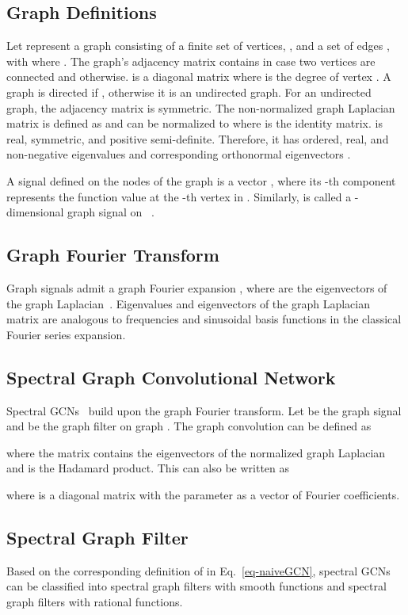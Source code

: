 \documentclass[runningheads]{llncs}
\begin{document}
\subsection{Graph Definitions}
Let  represent a graph consisting of a finite set of  vertices, , and a set of  edges , with  where .
The graph's adjacency matrix  contains  in case two vertices are connected and  otherwise. 
 is a diagonal matrix where  is the degree of vertex .
A graph is directed if , otherwise it is an undirected graph. For an undirected graph, the adjacency matrix is symmetric.
The non-normalized graph Laplacian matrix is defined as 
and can be normalized to 
where  is the identity matrix. 
 is  real, symmetric, and positive semi-definite. Therefore, it has  ordered, real, and non-negative eigenvalues  and corresponding orthonormal eigenvectors . 

A signal  defined on the nodes of the graph is a vector , where its -th component represents the function value at the -th vertex in . Similarly,  is called a -dimensional graph signal on ~\cite{shuman2013emerging}. 
\subsection{Graph Fourier Transform}
Graph signals  admit a graph Fourier expansion , where  are the eigenvectors of the  graph Laplacian~\cite{shuman2013emerging}. Eigenvalues and eigenvectors of the graph Laplacian matrix are analogous to frequencies and sinusoidal basis functions in the classical Fourier series expansion. 
\subsection{Spectral Graph Convolutional Network}
Spectral GCNs~\cite{bruna2013spectral} build upon the  graph Fourier transform. Let  be the graph signal and  be the graph filter on graph . The graph convolution  can be defined as

where the matrix  contains the eigenvectors of the normalized graph Laplacian and  is the Hadamard product.
This can also be written as
 
where  is a diagonal matrix with the parameter  as a vector of Fourier coefficients.



\subsection{Spectral Graph Filter}
Based on the corresponding definition of  in Eq.~\eqref{eq-naiveGCN}, spectral GCNs can be classified into spectral graph filters with smooth functions and spectral graph filters with rational functions.
\end{document}
